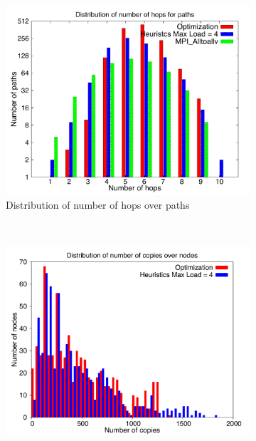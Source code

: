 \begin{figure}[!htbp]
        \centering
        \begin{subfigure}[b]{0.49\textwidth}
                \includegraphics[width=\textwidth]{report_figures/constantr/27_1024/hop_histo.pdf}
                \caption{Distribution of number of hops over paths}
                \label{fig:27_1024_hop}
        \end{subfigure}%
        ~ %
        \begin{subfigure}[b]{0.49\textwidth}
                \includegraphics[width=\textwidth]{report_figures/constantr/27_1024/copy_histo.pdf}

\end{subfigure}
\end{figure}
